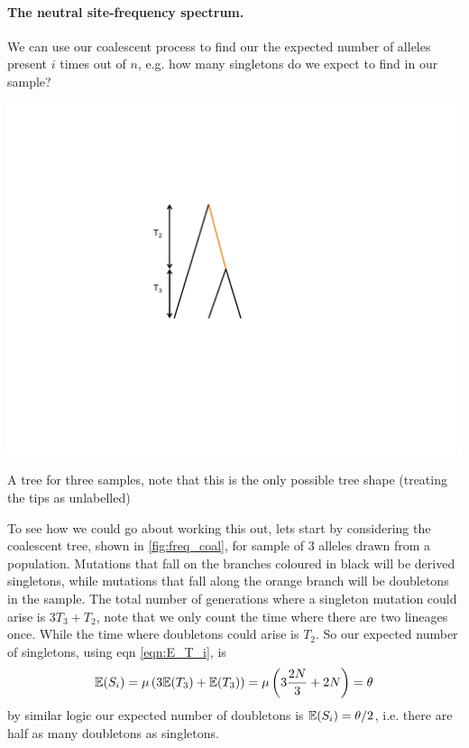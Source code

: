 \paragraph{The neutral site-frequency spectrum.}

We can use our coalescent process to find our the expected number of
alleles present $i$ times out of $n$, e.g. how many singletons do we
expect to find in our sample?  

\begin{marginfigure}
\begin{center}
\includegraphics[width= \textwidth]{figures/Genetic_drift/freq_spec_tree.pdf}
\end{center}
\caption{A tree for three samples, note that this is the only possible
tree shape (treating the tips as unlabelled)} \label{fig:freq_coal}
\end{marginfigure}

To see how we could go about working this out, lets start by
considering the coalescent tree, shown in \ref{fig:freq_coal}, for sample of $3$ alleles drawn from a
population. Mutations that fall on the
branches coloured in black will be derived singletons, while mutations that
fall along the orange branch will be doubletons in the sample. The
total number of generations where a singleton mutation could arise is
$3 T_3 + T_2$, note that we only count the time where there are two
lineages once. While the time where doubletons could arise is
$T_2$. So our expected number of singletons, using eqn \eqref{eqn:E_T_i}, is 
\begin{equation}
\mathbb{E}(S_i) = \mu \left( 3\mathbb{E}(T_3) +  \mathbb{E}(T_3) \right) = \mu \left( 3
  \frac{2N}{3}+ 2N \right) = \theta
\end{equation}
by similar logic our expected number of doubletons is $\mathbb{E}(S_i)
=\theta/2$, i.e. there are half as many doubletons as singletons. 

